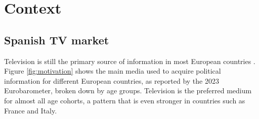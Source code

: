 \documentclass[12pt]{article}
\begin{document}
	
	
	
	
	\section{Context} 
	
	\label{section:context}
	
	
	\subsection{Spanish TV market}
	
	Television is still the primary source of information in most European countries \citep{europarl2024}. Figure \ref{fig:motivation} shows the main media used to acquire political information for different European countries, as reported by the 2023 Eurobarometer, broken down by age groups. Television is the preferred medium for almost all age cohorts, a pattern that is even stronger in countries such as France and Italy.
	
	
	
\end{document}
